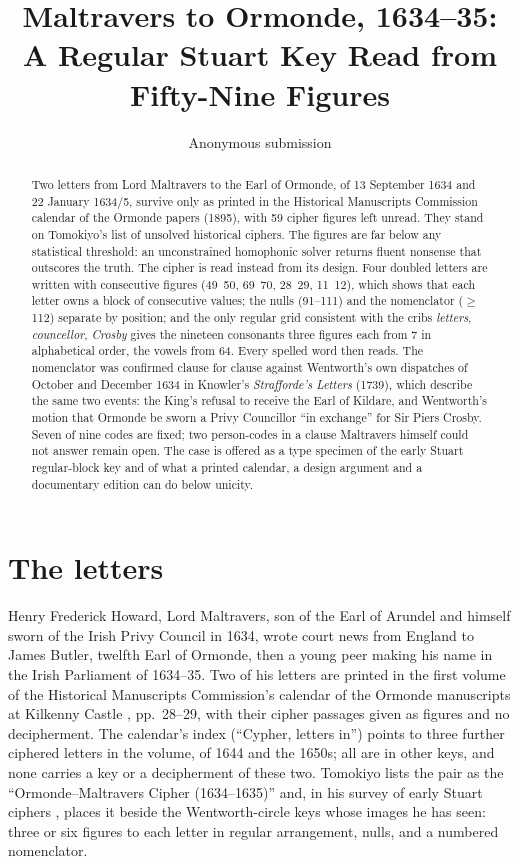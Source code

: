 \documentclass[11pt]{article}
\title{Maltravers to Ormonde, 1634--35: \\ A Regular Stuart Key Read from Fifty-Nine Figures}
\author{Anonymous submission}
\date{}
\begin{document}
\maketitle

\begin{abstract}
Two letters from Lord Maltravers to the Earl of Ormonde, of 13 September 1634 and 22 January 1634/5, survive only as printed in the Historical Manuscripts Commission calendar of the Ormonde papers (1895), with 59 cipher figures left unread. They stand on Tomokiyo's list of unsolved historical ciphers. The figures are far below any statistical threshold: an unconstrained homophonic solver returns fluent nonsense that outscores the truth. The cipher is read instead from its design. Four doubled letters are written with consecutive figures (49~50, 69~70, 28~29, 11~12), which shows that each letter owns a block of consecutive values; the nulls (91--111) and the nomenclator ($\geq$112) separate by position; and the only regular grid consistent with the cribs \emph{letters}, \emph{councellor}, \emph{Crosby} gives the nineteen consonants three figures each from 7 in alphabetical order, the vowels from 64. Every spelled word then reads. The nomenclator was confirmed clause for clause against Wentworth's own dispatches of October and December 1634 in Knowler's \emph{Strafforde's Letters} (1739), which describe the same two events: the King's refusal to receive the Earl of Kildare, and Wentworth's motion that Ormonde be sworn a Privy Councillor ``in exchange'' for Sir Piers Crosby. Seven of nine codes are fixed; two person-codes in a clause Maltravers himself could not answer remain open. The case is offered as a type specimen of the early Stuart regular-block key and of what a printed calendar, a design argument and a documentary edition can do below unicity.
\end{abstract}

\section{The letters}

Henry Frederick Howard, Lord Maltravers, son of the Earl of Arundel and himself sworn of the Irish Privy Council in 1634, wrote court news from England to James Butler, twelfth Earl of Ormonde, then a young peer making his name in the Irish Parliament of 1634--35. Two of his letters are printed in the first volume of the Historical Manuscripts Commission's calendar of the Ormonde manuscripts at Kilkenny Castle \cite{HMC:Ormonde1895}, pp.~28--29, with their cipher passages given as figures and no decipherment. The calendar's index (``Cypher, letters in'') points to three further ciphered letters in the volume, of 1644 and the 1650s; all are in other keys, and none carries a key or a decipherment of these two. Tomokiyo lists the pair as the ``Ormonde--Maltravers Cipher (1634--1635)''  and, in his survey of early Stuart ciphers , places it beside the Wentworth-circle keys whose images he has seen: three or six figures to each letter in regular arrangement, nulls, and a numbered nomenclator.
\end{document}
